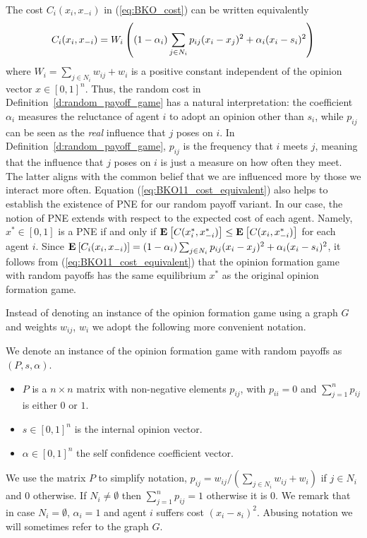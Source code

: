 The cost $C_i(x_i,x_{-i})$ in (\ref{eq:BKO_cost}) can be written equivalently
\begin{equation}\label{eq:BKO11_cost_equivalent}
  C_i(x_i,x_{-i}) =
  W_i\left( (1-\alpha_i)\sum_{j \in N_i} p_{ij}(x_i-x_j)^2
  + \alpha_i(x_i-s_i)^2\right)
\end{equation}
where $W_i=\sum_{j\in N_i}w_{ij} + w_i$ is a positive constant independent
of the opinion vector $x\in [0,1]^n$.
Thus, the random cost in Definition~\ref{d:random_payoff_game} has a natural
interpretation: the coefficient $\alpha_i$
measures the reluctance of agent $i$ to adopt an opinion other than $s_i$, while
$p_{ij}$ can be seen as the \emph{real} influence that $j$ poses on $i$.
In Definition~\ref{d:random_payoff_game}, $p_{ij}$ is the frequency that
$i$ meets $j$, meaning that the influence that $j$ poses on $i$ is just a measure
on how often they meet. The latter aligns with the common belief
that we are influenced more by those we interact more often.
Equation (\ref{eq:BKO11_cost_equivalent}) also helps to establish the existence of PNE for
our random payoff variant. In our case, the notion of PNE extends
with respect to the expected cost of each agent. Namely,
$x^* \in [0,1]$ is a PNE if and only if
$\Exp{C(x_i^*, x_{-i}^*)} \leq \Exp{C(x_i, x_{-i}^*)}$
for each agent $i$.
Since
$\bm{\mathrm{E}}_{} \left[ C_i(x_i,x_{-i}) \right]=
(1-\alpha_i) \sum_{j \in N_i}p_{ij}(x_i-x_j)^2 + \alpha_i(x_i-s_i)^2 $,
it follows from (\ref{eq:BKO11_cost_equivalent}) that the
opinion formation game with random payoffs has the same equilibrium $x^*$ as
the original opinion formation game.

Instead of denoting an instance of the opinion formation game using a graph $G$
and weights $w_{ij}$, $w_i$ we adopt the following more convenient notation.
%
\begin{definition}\label{d:random_payof_game_instance}
  We denote an instance of the opinion formation game with random payoffs as $(P,s,\alpha)$.
  \begin{itemize}
    \item $P$ is a $n \times n$  matrix with non-negative elements $p_{ij}$,
      with $p_{ii}=0$ and $\sum_{j=1}^n p_{ij}$ is either $0$ or $1$.
    \item $s \in [0,1]^n$ is the internal opinion vector.
    \item $\alpha \in [0,1]^n$ the self confidence coefficient vector.
  \end{itemize}
\end{definition}
%
We use the matrix $P$ to simplify notation, $p_{ij} = w_{ij}/(\sum_{j \in N_i}w_{ij}+w_i)$ if $j \in N_i$ and $0$ otherwise.
If $N_i \neq \emptyset$ then $\sum_{j=1}^n p_{ij}=1$ otherwise it is $0$. We remark that in case $N_i=\emptyset$, $\alpha_i=1$
and agent $i$ suffers cost $(x_i-s_i)^2$.
Abusing notation we will sometimes refer to the graph $G$.


